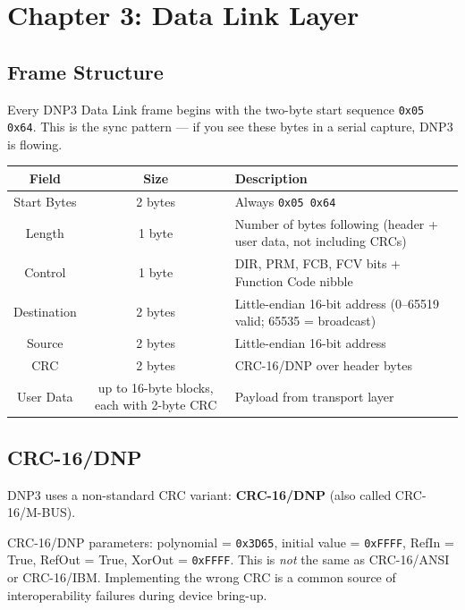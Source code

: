 \documentclass[11pt,twoside]{article}
\begin{document}
\section{Chapter 3: Data Link Layer}

\subsection{Frame Structure}

Every DNP3 Data Link frame begins with the two-byte start sequence \texttt{0x05 0x64}. This is the sync pattern --- if you see these bytes in a serial capture, DNP3 is flowing.

\begin{center}
\begin{tabularx}{\textwidth}{|c|c|X|}
\hline
\textbf{Field} & \textbf{Size} & \textbf{Description} \\
\hline
Start Bytes & 2 bytes & Always \texttt{0x05 0x64} \\
Length & 1 byte & Number of bytes following (header + user data, not including CRCs) \\
Control & 1 byte & DIR, PRM, FCB, FCV bits + Function Code nibble \\
Destination & 2 bytes & Little-endian 16-bit address (0--65519 valid; 65535 = broadcast) \\
Source & 2 bytes & Little-endian 16-bit address \\
CRC & 2 bytes & CRC-16/DNP over header bytes \\
User Data & up to 16-byte blocks, each with 2-byte CRC & Payload from transport layer \\
\hline
\end{tabularx}
\end{center}

\subsection{CRC-16/DNP}

DNP3 uses a non-standard CRC variant: \textbf{CRC-16/DNP} (also called CRC-16/M-BUS).

\begin{specbox}
CRC-16/DNP parameters: polynomial = \texttt{0x3D65}, initial value = \texttt{0xFFFF}, RefIn = True, RefOut = True, XorOut = \texttt{0xFFFF}. This is \emph{not} the same as CRC-16/ANSI or CRC-16/IBM. Implementing the wrong CRC is a common source of interoperability failures during device bring-up.
\end{specbox}
\end{document}

